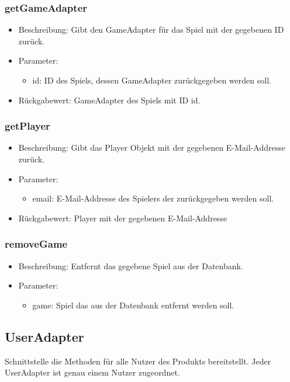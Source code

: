 \documentclass[a4paper]{scrreprt}
\begin{document}
	\subsubsection{getGameAdapter}
	\begin{itemize}
		\item Beschreibung: Gibt den GameAdapter für das Spiel mit der gegebenen ID zurück.
		\item Parameter:
		\begin{itemize}
			\item id: ID des Spiels, dessen GameAdapter zurückgegeben werden soll.
		\end{itemize}
		\item Rückgabewert: GameAdapter des Spiels mit ID id.
	\end{itemize}

	\subsubsection{getPlayer}
	\begin{itemize}
		\item Beschreibung: Gibt das Player Objekt mit der gegebenen E-Mail-Addresse zurück.
		\item Parameter:
		\begin{itemize}
			\item email: E-Mail-Addresse des Spielers der zurückgegeben werden soll.
		\end{itemize}
		\item Rückgabewert: Player mit der gegebenen E-Mail-Addresse
	\end{itemize}

	\subsubsection{removeGame}
	\begin{itemize}
		\item Beschreibung: Entfernt das gegebene Spiel aus der Datenbank.
		\item Parameter:
		\begin{itemize}
			\item game: Spiel das aus der Datenbank entfernt werden soll.
		\end{itemize}
	\end{itemize}
	
	\subsection{UserAdapter}
	Schnittstelle die Methoden für alle Nutzer des Produkts bereitstellt.
	Jeder UserAdapter ist genau einem Nutzer zugeordnet.
	
\end{document}
